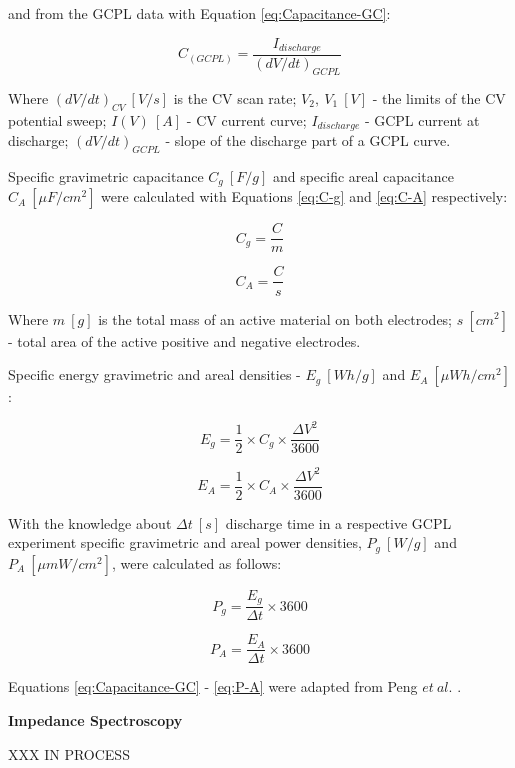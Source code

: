 and from the GCPL data with Equation \ref{eq:Capacitance-GC}:

\begin{equation}
\label{eq:Capacitance-GC}
C_{(GCPL)} = \frac{I_{discharge}}{(dV/dt)_{GCPL}}
\end{equation}

Where $(dV/dt)_{CV}\:[V/s]$ is the CV scan rate; $V_2,\: V_1\: [V]$ - the limits of the CV potential sweep; $I(V)\:[A]$ - CV current curve; $I_{discharge}$ - GCPL current at discharge; $(dV/dt)_{GCPL}$ - slope of the discharge part of a GCPL curve.


Specific gravimetric capacitance $C_g\:[F/g]$ and specific areal capacitance $C_A\:[\mu F/cm^2]$ were calculated with Equations \ref{eq:C-g} and \ref{eq:C-A} respectively:

\begin{equation}
\label{eq:C-g}
C_g = \frac{C}{m}
\end{equation}

\begin{equation}
\label{eq:C-A}
C_A = \frac{C}{s}
\end{equation}

Where $m\:[g]$ is the total mass of an active material on both electrodes; $s\:[cm^2]$ - total area of the active positive and negative electrodes.

Specific energy gravimetric and areal densities - $E_g\:[Wh/g]$ and $E_A\:[\mu Wh/cm^2]$:

\begin{equation}
\label{eq:E-g}
E_g = \frac{1}{2} \times C_g \times \frac{\Delta V^2}{3600}
\end{equation}

\begin{equation}
\label{eq:E-A}
E_A = \frac{1}{2} \times C_A \times \frac{\Delta V^2}{3600}
\end{equation}

With the knowledge about $\Delta t\:[s]$ discharge time in a respective GCPL experiment specific gravimetric and areal power densities, $P_g\:[W/g]$ and $P_A\:[\mu mW/cm^2]$, were calculated as follows:

\begin{equation}
\label{eq:P-g}
P_g = \frac{E_g}{\Delta t} \times 3600
\end{equation}

\begin{equation}
\label{eq:P-A}
P_A = \frac{E_A}{\Delta t} \times 3600
\end{equation}

Equations \ref{eq:Capacitance-GC} - \ref{eq:P-A} were adapted from Peng $et\: al.$ \cite{peng_flexible_2015}.


\textbf{Impedance Spectroscopy}

XXX IN PROCESS








